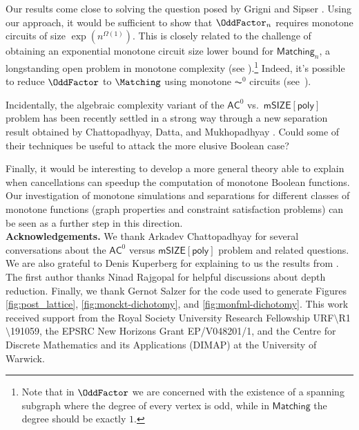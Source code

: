 \documentclass[11pt]{article}
\begin{document}
Our results come close to solving the question posed by Grigni and Sipser
\citep{gs92}. Using our approach, it would be sufficient to show that
$\OddFactor_n$ requires monotone circuits of size $\exp(n^{\Omega(1)})$.
This is closely related to the challenge of obtaining an exponential
monotone circuit size lower bound for $\mathsf{Matching}_n$, a longstanding
open problem in monotone complexity (see \citep[Section
9.11]{jukna_2012}).\footnote{Note that in $\OddFactor$ we are concerned
with the existence of a spanning subgraph where the degree of every vertex
is odd, while in $\mathsf{Matching}$ the degree should be exactly $1$.}
Indeed, it's possible to reduce $\OddFactor$ to $\Matching$
using monotone $\AC^0$ circuits (see~\cite[Lemma 6.18]{akiyama_factors_2011}).

Incidentally, the algebraic complexity variant of the $\mathsf{AC}^0$
vs.~$\mathsf{mSIZE}[\mathsf{poly}]$ problem has been recently settled in a
strong way through a new separation result obtained by Chattopadhyay,
Datta, and  Mukhopadhyay \cite{cdm21}. Could some of  their techniques be
useful to attack the more elusive Boolean case?

Finally, it would be interesting to develop a more general theory able to
explain when cancellations can speedup the computation of monotone Boolean
functions. Our investigation of monotone simulations and separations for
different classes of monotone functions (graph properties and constraint
satisfaction problems) can be seen as a further step in this direction.
\\









\noindent \textbf{Acknowledgements.} We thank Arkadev Chattopadhyay for
several conversations about the $\mathsf{AC}^0$ versus
$\mathsf{mSIZE}[\mathsf{poly}]$ problem and related questions. We are also
grateful to Denis Kuperberg for explaining to us the results from
\cite{DBLP:conf/lics/Kuperberg21, DBLP:journals/corr/abs-2201-11619}. The
first author thanks Ninad Rajgopal for helpful discussions about
depth reduction. 
Finally, we thank Gernot Salzer for the code used to generate Figures
\ref{fig:post_lattice}, \ref{fig:monckt-dichotomy}, and
\ref{fig:monfml-dichotomy}.
This
work received support from the Royal Society University Research Fellowship
URF$\setminus$R1$\setminus$191059, the EPSRC New Horizons Grant
EP/V048201/1, and the Centre for Discrete
Mathematics and its Applications (DIMAP) at the University of Warwick.
\end{document}
